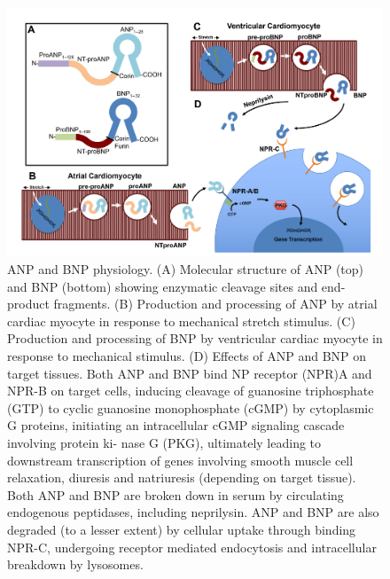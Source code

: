 \documentclass[14pt,a4paper,onecolumn]{extarticle}
\begin{document}

\begin{figure}      \centering      \includegraphics[scale=0.4]{../../images/NP_physiology.png}      \caption{ANP and BNP physiology. (A) Molecular structure of ANP (top) and BNP (bottom) showing enzymatic cleavage sites and end-product fragments. (B) Production and processing of ANP by atrial cardiac myocyte in response to mechanical stretch stimulus. (C) Production and processing of BNP by ventricular cardiac myocyte in response to mechanical stimulus. (D) Effects of ANP and BNP on target tissues. Both ANP and BNP bind NP receptor (NPR)A and NPR-B on target cells, inducing cleavage of guanosine triphosphate (GTP) to cyclic guanosine monophosphate (cGMP) by cytoplasmic G proteins, initiating an intracellular cGMP signaling cascade involving protein ki- nase G (PKG), ultimately leading to downstream transcription of genes involving smooth muscle cell relaxation, diuresis and natriuresis (depending on target tissue). Both ANP and BNP are broken down in serum by circulating endogenous peptidases, including neprilysin. ANP and BNP are also degraded (to a lesser extent) by cellular uptake through binding NPR-C, undergoing receptor mediated endocytosis and intracellular breakdown by lysosomes. \citep{Maisel2018}}       \label{NP_physiology}  \end{figure} %
\end{document}
